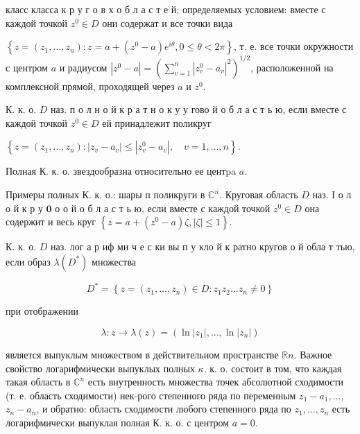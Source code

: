 \documentclass[10pt]{article}
\begin{document}
класс класса к р у г о в х о б л а с т е й, определяемых условием: вместе с каждой точкой $z^{0} \in D$ они содержат и все точки вида



$\left\{z=\left(z_{1}, \ldots, z_{n}\right): z=a+\left(z^{0}-a\right) e^{i \theta}, 0 \leq \theta<2 \pi\right\}$, т. е. все точки окружности с центром $a$ и радиусом $\left|z^{0}-a\right|=\left(\sum_{v=1}^{n}\left|z_{v}^{0}-a_{v}\right|^{2}\right)^{1 / 2}$, расположенной на комплексной прямой, проходящей через $a$ и $z^{0}$.



К. к. о. $D$ наз. п о л н о й к р а т н о к у у гово й о б л а с т ь ю, если вместе с каждой точкой $z^{0} \in D$ ей принадлежит поликруг



$\left\{z=\left(z_{1}, \ldots, z_{n}\right):\left|z_{v}-a_{v}\right| \leqslant\left|z_{v}^{0}-a_{v}\right|, \quad v=1, \ldots, n\right\}$.



Полная К. к. о. звездообразна относительно ее центpa $a$.



Примеры полных К. к. о.: шары п поликруги в $\mathbb{C}^{n}$. Круговая область $D$ наз. І о л о й к р у $\mathbf{0}$ о о й о б л а с т ь ю, если вместе с каждой точкой $z^{0} \in D$ она содержит и весь круг $\left\{z=a+\left(z^{0}-a\right) \zeta,|\zeta| \leqslant 1\right\}$.



К. к. о. $D$ наз. лог а р иф ми ч е с ки вы п у кло й к ратно кругов о й обла т тью, если образ $\lambda\left(D^{*}\right)$ множества



\[

D^{*}=\left\{z=\left(z_{1}, \ldots, z_{n}\right) \in D: z_{1} z_{2} \ldots z_{n} \neq 0\right\}

\]



при отображении



\[

\lambda: z \longrightarrow \lambda(z)=\left(\ln \left|z_{1}\right|, \ldots, \ln \left|z_{n}\right|\right)

\]



является выпуклым множеством в действительном пространстве $\mathbb{R} n$. Важное свойство логарифмически выпуклых полных $\kappa$. к. о. состоит в том, что каждая такая область в $\mathbb{C}^{n}$ есть внутренность множества точек абсолютной сходимости (т. е. область сходимости) нек-рого степенного ряда по переменным $z_{1}-a_{1}, \ldots$, $z_{n}-a_{n}$, и обратно: область сходимости любого степенного ряда по $z_{1}, \ldots, z_{n}$ есть логарифмически выпуклая полная К. к. о. с центром $a=0$.
\end{document}

